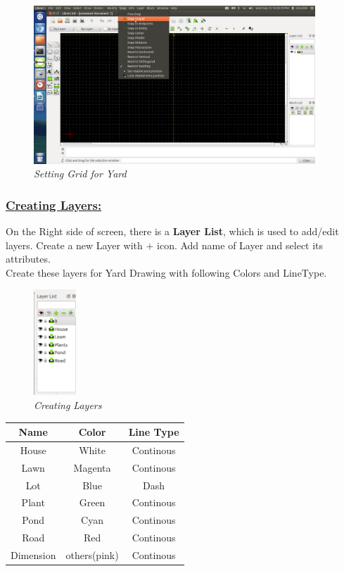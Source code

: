 \begin{itemize}
{\begin{figure}[h!]
       \centering\includegraphics[width=400px]{./images-yard/snap.png}
       \caption{\small \sl Setting Grid for Yard}
       \end{figure}}
\end{itemize}\vspace{5mm}
%
\subsubsection*{\underline{Creating Layers:}}
On the Right side of screen, there is a \textbf{Layer List}, which is used to add/edit layers. Create a new Layer with $+$ icon. Add name of Layer and select its attributes.
\\Create these layers for Yard Drawing with following Colors and LineType.
       \begin{figure}[h!]
       \centering\includegraphics[width=60px]{./images-yard/layers.png}
       \caption{\small \sl Creating Layers}
       \end{figure}
\begin{table}[h!]\centering\begin{tabular}{|c|c|c|}
\hline \textbf{Name} & \textbf{Color} & \textbf{Line Type}\\ 
\hline House & White & Continous\\
\hline Lawn & Magenta & Continous\\
\hline Lot & Blue & Dash\\
\hline Plant & Green & Continous\\
\hline Pond & Cyan & Continous\\
\hline Road & Red & Continous\\
\hline Dimension & others(pink) & Continous\\
\hline \end{tabular}\end{table} 
\vspace{.3in}
%

